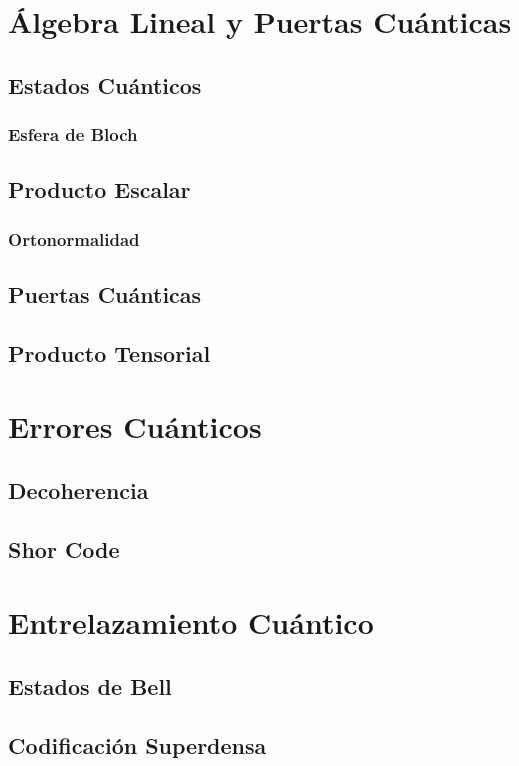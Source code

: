 \documentclass{article}
\numberwithin{equation}{section} %
\begin{document}
    \newpage
    \thispagestyle{empty}
    \mbox{}
    

    \section{Álgebra Lineal y Puertas Cuánticas}
    \subsection{Estados Cuánticos}
    \subsubsection{Esfera de Bloch}    
    \subsection{Producto Escalar}
    \subsubsection{Ortonormalidad}
    \subsection{Puertas Cuánticas}
    \subsection{Producto Tensorial}
    \section{Errores Cuánticos}
    \subsection{Decoherencia}
    \subsection{Shor Code}
    \section{Entrelazamiento Cuántico}
    \subsection{Estados de Bell}
    \subsection{Codificación Superdensa}
\end{document}
